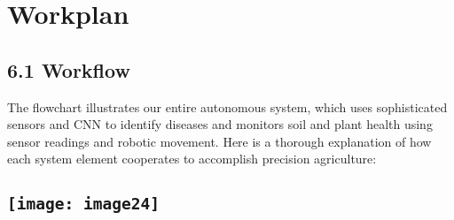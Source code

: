 \documentclass{book} %
\begin{document}
\noindent 
\chapter{Workplan}

\noindent 
\section{6.1 Workflow}

\noindent The flowchart illustrates our entire autonomous system, which uses sophisticated sensors and CNN to identify diseases and monitors soil and plant health using sensor readings and robotic movement. Here is a thorough explanation of how each system element cooperates to accomplish precision agriculture:

\noindent \textbf{}

\noindent \textbf{}

\noindent \textbf{}

\noindent \textbf{}

\noindent 
\section{\texttt{[image: image24]}}

\noindent 
\section{}

\noindent 
\section{}

\noindent 
\section{}

\noindent 
\section{}

\noindent 
\section{}

\noindent 
\section{}
\end{document}
